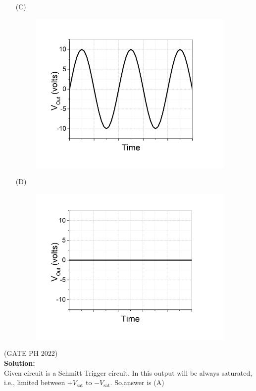 \documentclass[journal,12pt,twocolumn]{IEEEtran}
\theoremstyle{remark}
\begin{document}
\begin{enumerate}
  \item[(C)]
  \setcounter{figure}{2}
    \begin{figure}[h]
        \centering
        \includegraphics[width=0.8\linewidth]{figs/3.png}
        \label{fig:avv_label}
    \end{figure}
    
  \item[(D)]
  \setcounter{figure}{3}
    \begin{figure}[h]
        \centering
        \includegraphics[width=0.8\linewidth]{figs/4.png}
        \label{fig:abb_label}
    \end{figure}
\end{enumerate}

\hfill{(GATE PH 2022)}\\
\textbf{Solution:} \\
Given circuit is a Schmitt Trigger circuit. In this output will be always saturated, i.e., limited between \( +V_{\text{sat}} \) to \( -V_{\text{sat}} \).
So,answer is (A)
\end{document}
